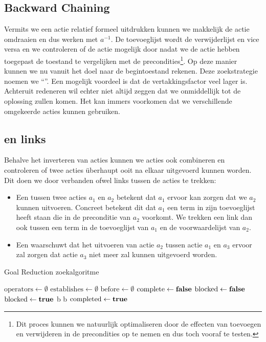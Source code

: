 \subsection{Backward Chaining}
Vermits we een actie relatief formeel uitdrukken kunnen we makkelijk de actie omdraaien en dus werken met $a^{-1}$. De toevoeglijst wordt de verwijderlijst en vice versa en we controleren of de actie mogelijk door nadat we de actie hebben toegepast de toestand te vergelijken met de precondities\footnote{Dit proces kunnen we natuurlijk optimaliseren door de effecten van toevoegen en verwijderen in de precondities op te nemen en dus toch vooraf te testen.}. Op deze manier kunnen we nu vanuit het doel naar de begintoestand rekenen. Deze zoekstrategie noemen we ``''. Een mogelijk voordeel is dat de vertakkingsfactor veel lager is. Achteruit redeneren wil echter niet altijd zeggen dat we onmiddellijk tot de oplossing zullen komen. Het kan immers voorkomen dat we verschillende omgekeerde acties kunnen gebruiken.
\subsection{{} en {} links}
Behalve het inverteren van acties kunnen we acties ook combineren en controleren of twee acties \"uberhaupt ooit na elkaar uitgevoerd kunnen worden. Dit doen we door verbanden ofwel links tussen de acties te trekken:
\begin{itemize}
 \item Een  tussen twee acties $a_1$ en $a_2$ betekent dat $a_1$ ervoor kan zorgen dat we $a_2$ kunnen uitvoeren. Concreet betekent dit dat $a_1$ een term in zijn toevoeglijst heeft staan die in de preconditie van $a_2$ voorkomt. We trekken een {} link dan ook tussen een term in de toevoeglijst van $a_1$ en de voorwaardelijst van $a_2$.
 \item Een  waarschuwt dat het uitvoeren van actie $a_2$ tussen actie $a_1$ en $a_3$ ervoor zal zorgen dat actie $a_3$ niet meer zal kunnen uitgevoerd worden.
\end{itemize}
\begin{algorithm}[htb]
\caption{Goal Reduction zoekalgoritme}
\label{alg:goalReduction}
\begin{algorithmic}[1]
\STATE $\mbox{operators}\gets\emptyset$
\STATE $\mbox{establishes}\gets\emptyset$
\STATE $\mbox{before}\gets\emptyset$
\STATE $\mbox{complete}\gets\mbox{\bf false}$
\STATE $\mbox{blocked}\gets\mbox{\bf false}$
\STATE $\mbox{blocked}\gets\mbox{\bf true}$
\STATE b
\STATE b
\ELSE
\STATE $\mbox{completed}\gets\mbox{\bf true}$
\ENDIF
\ENDWHILE
\end{algorithmic}
\end{algorithm}
